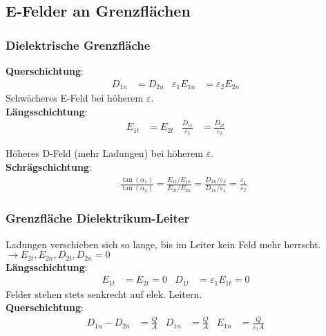 \subsection{E-Felder an Grenzflächen}
\subsubsection{Dielektrische Grenzfläche}
\textbf{Querschichtung}:
\begin{align*}
	D_{1n} &= D_{2n} & \varepsilon_1 E_{1n}&=\varepsilon_2 E_{2n}&
\end{align*}
Schwächeres E-Feld bei höherem $ \varepsilon $.\\

\textbf{Längsschichtung}:
\begin{align*}
	E_{1t} &= E_{2t} &  \frac{D_{1t}}{\varepsilon_1} &= \frac{D_{2t}}{\varepsilon_2}&
\end{align*}

Höheres D-Feld (mehr Ladungen) bei höherem $ \varepsilon $.\\

\textbf{Schrägschichtung}:
\begin{align*}
	&\frac{\tan( \alpha_1)}{\tan( \alpha_2)} = \frac{E_{1t}/E_{1n}}{E_{2t}/E_{2n}} = \frac{D_{2n}/\varepsilon_2}{D_{1n}/\varepsilon_1} = \frac{ \varepsilon_1}{\varepsilon_2}
\end{align*}

\subsubsection{Grenzfläche Dielektrikum-Leiter}
Ladungen verschieben sich so lange, bis im Leiter kein Feld mehr herrscht. $\rightarrow E_{2t}, E_{2n}, D_{2t}, D_{2n} = 0 $\\

\textbf{Längsschichtung}:
\begin{align*}
E_{1t} &= E_{2t} = 0 & D_{1t} &=\varepsilon_1 E_{1t} = 0 &
\end{align*}
Felder stehen stets senkrecht auf elek. Leitern.\\

\textbf{Querschichtung}:
\begin{align*}
	D_{1n} - D_{2n} &= \frac{Q}{A} & D_{1n}&= \frac{Q}{A} & E_{1n}&= \frac{Q}{\varepsilon_1 A}&
\end{align*}

